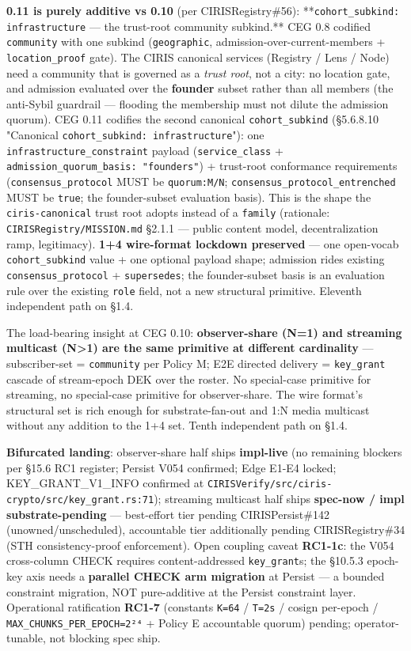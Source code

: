 \documentclass[10pt]{article}
\begin{document}
\textbf{0.11 is purely additive vs 0.10} (per CIRISRegistry\#56): **\texttt{cohort\_subkind: infrastructure} — the trust-root community subkind.** CEG 0.8 codified \texttt{community} with one subkind (\texttt{geographic}, admission-over-current-members + \texttt{location\_proof} gate). The CIRIS canonical services (Registry / Lens / Node) need a community that is governed as a \textit{trust root}, not a city: no location gate, and admission evaluated over the \textbf{founder} subset rather than all members (the anti-Sybil guardrail — flooding the membership must not dilute the admission quorum). CEG 0.11 codifies the second canonical \texttt{cohort\_subkind} (§5.6.8.10 "Canonical \texttt{cohort\_subkind: infrastructure}"): one \texttt{infrastructure\_constraint} payload (\texttt{service\_class} + \texttt{admission\_quorum\_basis: "founders"}) + trust-root conformance requirements (\texttt{consensus\_protocol} MUST be \texttt{quorum:M/N}; \texttt{consensus\_protocol\_entrenched} MUST be \texttt{true}; the founder-subset evaluation basis). This is the shape the \texttt{ciris-canonical} trust root adopts instead of a \texttt{family} (rationale: \texttt{CIRISRegistry/MISSION.md} §2.1.1 — public content model, decentralization ramp, legitimacy). \textbf{1+4 wire-format lockdown preserved} — one open-vocab \texttt{cohort\_subkind} value + one optional payload shape; admission rides existing \texttt{consensus\_protocol} + \texttt{supersedes}; the founder-subset basis is an evaluation rule over the existing \texttt{role} field, not a new structural primitive. Eleventh independent path on §1.4.



The load-bearing insight at CEG 0.10: \textbf{observer-share (N=1) and streaming multicast (N>1) are the same primitive at different cardinality} — subscriber-set = \texttt{community} per Policy M; E2E directed delivery = \texttt{key\_grant} cascade of stream-epoch DEK over the roster. No special-case primitive for streaming, no special-case primitive for observer-share. The wire format's structural set is rich enough for substrate-fan-out and 1:N media multicast without any addition to the 1+4 set. Tenth independent path on §1.4.


\textbf{Bifurcated landing}: observer-share half ships \textbf{impl-live} (no remaining blockers per §15.6 RC1 register; Persist V054 confirmed; Edge E1-E4 locked; KEY\_GRANT\_V1\_INFO confirmed at \texttt{CIRISVerify/src/ciris-crypto/src/key\_grant.rs:71}); streaming multicast half ships \textbf{spec-now / impl substrate-pending} — best-effort tier pending CIRISPersist\#142 (unowned/unscheduled), accountable tier additionally pending CIRISRegistry\#34 (STH consistency-proof enforcement). Open coupling caveat \textbf{RC1-1c}: the V054 cross-column CHECK requires content-addressed \texttt{key\_grant}s; the §10.5.3 epoch-key axis needs a \textbf{parallel CHECK arm migration} at Persist — a bounded constraint migration, NOT pure-additive at the Persist constraint layer. Operational ratification \textbf{RC1-7} (constants \texttt{K=64} / \texttt{T=2s} / cosign per-epoch / \texttt{MAX\_CHUNKS\_PER\_EPOCH=2²⁴} + Policy E accountable quorum) pending; operator-tunable, not blocking spec ship.
\end{document}
